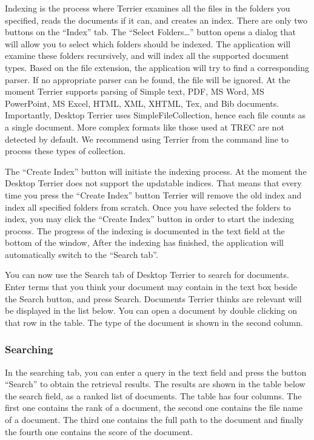 Indexing is the process where Terrier examines all the files in the
folders you specified, reads the documents if it can, and creates an
index. There are only two buttons on the ``Index'' tab. The ``Select
Folders\ldots{}'' button opens a dialog that will allow you to select
which folders should be indexed. The application will examine these
folders recursively, and will index all the supported document types.
Based on the file extension, the application will try to find a
corresponding parser. If no appropriate parser can be found, the file
will be ignored. At the moment Terrier supports parsing of Simple text,
PDF, MS Word, MS PowerPoint, MS Excel, HTML, XML, XHTML, Tex, and Bib
documents. Importantly, Desktop Terrier uses SimpleFileCollection, hence
each file counts as a single document. More complex formats like those
used at TREC are not detected by default. We recommend using Terrier
from the command line to process these types of collection.

The ``Create Index'' button will initiate the indexing process. At the
moment the Desktop Terrier does not support the updatable indices. That
means that every time you press the ``Create Index'' button Terrier will
remove the old index and index all specified folders from scratch. Once
you have selected the folders to index, you may click the ``Create
Index'' button in order to start the indexing process. The progress of
the indexing is documented in the text field at the bottom of the
window, After the indexing has finished, the application will
automatically switch to the ``Search tab''.

You can now use the Search tab of Desktop Terrier to search for
documents. Enter terms that you think your document may contain in the
text box beside the Search button, and press Search. Documents Terrier
thinks are relevant will be displayed in the list below. You can open a
document by double clicking on that row in the table. The type of the
document is shown in the second column.

\subsubsection{Searching}\label{searching}

In the searching tab, you can enter a query in the text field and press
the button ``Search'' to obtain the retrieval results. The results are
shown in the table below the search field, as a ranked list of
documents. The table has four columns. The first one contains the rank
of a document, the second one contains the file name of a document. The
third one contains the full path to the document and finally the fourth
one contains the score of the document.

